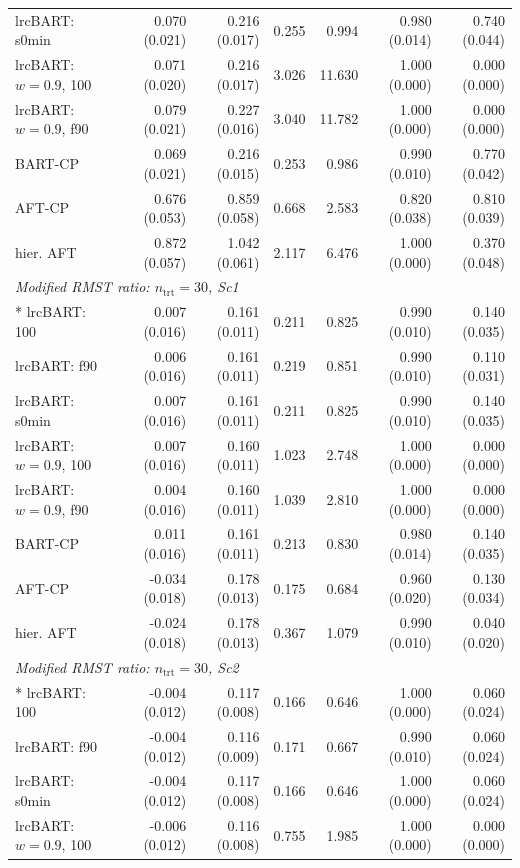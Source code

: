 \begin{landscape}
\begin{longtable}{lrrrrrr}
lrcBART: s0min & 0.070 (0.021) & 0.216 (0.017) & 0.255 & 0.994 & 0.980 (0.014) & 0.740 (0.044) \\
lrcBART: $w=0.9$, 100 & 0.071 (0.020) & 0.216 (0.017) & 3.026 & 11.630 & 1.000 (0.000) & 0.000 (0.000) \\
lrcBART: $w=0.9$, f90 & 0.079 (0.021) & 0.227 (0.016) & 3.040 & 11.782 & 1.000 (0.000) & 0.000 (0.000) \\
BART-CP & 0.069 (0.021) & 0.216 (0.015) & 0.253 & 0.986 & 0.990 (0.010) & 0.770 (0.042) \\
AFT-CP & 0.676 (0.053) & 0.859 (0.058) & 0.668 & 2.583 & 0.820 (0.038) & 0.810 (0.039) \\
hier. AFT & 0.872 (0.057) & 1.042 (0.061) & 2.117 & 6.476 & 1.000 (0.000) & 0.370 (0.048) \\
\multicolumn{7}{l}{\strut\textit{Modified RMST ratio: $n_{\mathrm{trt}}=30$, Sc1}}\\*
lrcBART: 100 & 0.007 (0.016) & 0.161 (0.011) & 0.211 & 0.825 & 0.990 (0.010) & 0.140 (0.035) \\
lrcBART: f90 & 0.006 (0.016) & 0.161 (0.011) & 0.219 & 0.851 & 0.990 (0.010) & 0.110 (0.031) \\
lrcBART: s0min & 0.007 (0.016) & 0.161 (0.011) & 0.211 & 0.825 & 0.990 (0.010) & 0.140 (0.035) \\
lrcBART: $w=0.9$, 100 & 0.007 (0.016) & 0.160 (0.011) & 1.023 & 2.748 & 1.000 (0.000) & 0.000 (0.000) \\
lrcBART: $w=0.9$, f90 & 0.004 (0.016) & 0.160 (0.011) & 1.039 & 2.810 & 1.000 (0.000) & 0.000 (0.000) \\
BART-CP & 0.011 (0.016) & 0.161 (0.011) & 0.213 & 0.830 & 0.980 (0.014) & 0.140 (0.035) \\
AFT-CP & -0.034 (0.018) & 0.178 (0.013) & 0.175 & 0.684 & 0.960 (0.020) & 0.130 (0.034) \\
hier. AFT & -0.024 (0.018) & 0.178 (0.013) & 0.367 & 1.079 & 0.990 (0.010) & 0.040 (0.020) \\
\multicolumn{7}{l}{\strut\textit{Modified RMST ratio: $n_{\mathrm{trt}}=30$, Sc2}}\\*
lrcBART: 100 & -0.004 (0.012) & 0.117 (0.008) & 0.166 & 0.646 & 1.000 (0.000) & 0.060 (0.024) \\
lrcBART: f90 & -0.004 (0.012) & 0.116 (0.009) & 0.171 & 0.667 & 0.990 (0.010) & 0.060 (0.024) \\
lrcBART: s0min & -0.004 (0.012) & 0.117 (0.008) & 0.166 & 0.646 & 1.000 (0.000) & 0.060 (0.024) \\
lrcBART: $w=0.9$, 100 & -0.006 (0.012) & 0.116 (0.008) & 0.755 & 1.985 & 1.000 (0.000) & 0.000 (0.000) \\

\end{longtable}
\end{landscape}
